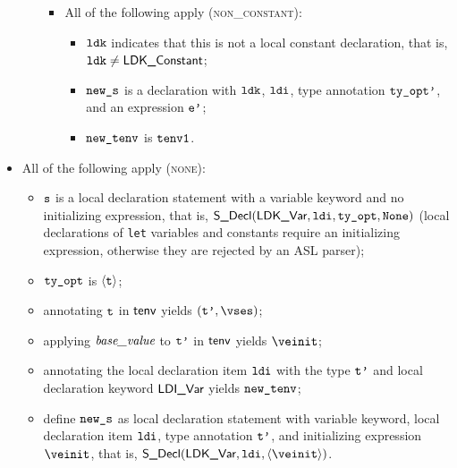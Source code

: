 \begin{itemize}
\begin{itemize}
\begin{itemize}
      \item All of the following apply (\textsc{non\_constant}):
      \begin{itemize}
        \item $\texttt{ldk}$ indicates that this is not a local constant declaration, that is, $\texttt{ldk}\neq\textsf{LDK\_Constant}$;
        \item $\texttt{new\_s}$ is a declaration with $\texttt{ldk}$, $\texttt{ldi}$, type annotation $\texttt{ty\_opt'}$, and an expression $\texttt{e'}$;
        \item $\texttt{new\_tenv}$ is $\texttt{tenv1}$.
      \end{itemize}
    \end{itemize}
  \end{itemize}

  \item All of the following apply (\textsc{none}):
  \begin{itemize}
  \item $\texttt{s}$ is a local declaration statement with a variable keyword and no initializing expression,
        that is, $\textsf{S\_Decl}(\textsf{LDK\_Var}, \texttt{ldi}, \texttt{ty\_opt}, \texttt{None})$ (local declarations of \texttt{let} variables and constants require
        an initializing expression, otherwise they are rejected by an ASL parser);
  \item $\texttt{ty\_opt}$ is $\langle\texttt{t}\rangle$\ProseOrTypeError;
  \item annotating $\texttt{t}$ in $\textsf{tenv}$ yields $(\vtp, \vses)$\ProseOrTypeError;
  \item applying $\textit{base\_value}$ to $\texttt{t'}$ in $\textsf{tenv}$ yields $\veinit$\ProseOrTypeError;
  \item annotating the local declaration item $\texttt{ldi}$ with the type $\texttt{t'}$ and local declaration keyword $\textsf{LDI\_Var}$
        yields $\texttt{new\_tenv}$\ProseOrTypeError;
  \item define $\texttt{new\_s}$ as local declaration statement with variable keyword, local declaration item $\texttt{ldi}$, type annotation $\texttt{t'}$, and initializing expression $\veinit$, that is, $\SDecl(\LDKVar, \ldi, \langle\veinit\rangle)$.
  \end{itemize}
\end{itemize}
